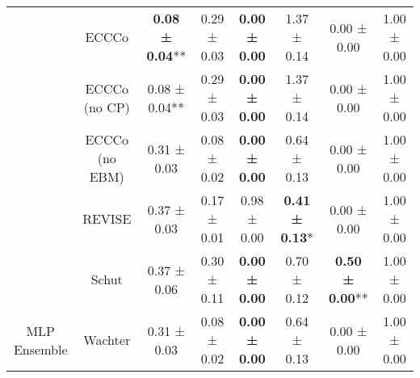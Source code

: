 \begin{table}
{\begin{tabular}[t]{cccccccc}
 & ECCCo & \textbf{0.08 ± 0.04}** & 0.29 ± 0.03\hphantom{*}\hphantom{*} & \textbf{0.00 ± 0.00}\hphantom{*}\hphantom{*} & 1.37 ± 0.14\hphantom{*}\hphantom{*} & 0.00 ± 0.00\hphantom{*}\hphantom{*} & 1.00 ± 0.00\hphantom{*}\hphantom{*}\\

 & ECCCo (no CP) & 0.08 ± 0.04** & 0.29 ± 0.03\hphantom{*}\hphantom{*} & \textbf{0.00 ± 0.00}\hphantom{*}\hphantom{*} & 1.37 ± 0.14\hphantom{*}\hphantom{*} & 0.00 ± 0.00\hphantom{*}\hphantom{*} & 1.00 ± 0.00\hphantom{*}\hphantom{*}\\

 & ECCCo (no EBM) & 0.31 ± 0.03\hphantom{*}\hphantom{*} & 0.08 ± 0.02\hphantom{*}\hphantom{*} & \textbf{0.00 ± 0.00}\hphantom{*}\hphantom{*} & 0.64 ± 0.13\hphantom{*}\hphantom{*} & 0.00 ± 0.00\hphantom{*}\hphantom{*} & 1.00 ± 0.00\hphantom{*}\hphantom{*}\\

 & REVISE & 0.37 ± 0.03\hphantom{*}\hphantom{*} & 0.17 ± 0.01\hphantom{*}\hphantom{*} & 0.98 ± 0.00\hphantom{*}\hphantom{*} & \textbf{0.41 ± 0.13}*\hphantom{*} & 0.00 ± 0.00\hphantom{*}\hphantom{*} & 1.00 ± 0.00\hphantom{*}\hphantom{*}\\

 & Schut & 0.37 ± 0.06\hphantom{*}\hphantom{*} & 0.30 ± 0.11\hphantom{*}\hphantom{*} & \textbf{0.00 ± 0.00}\hphantom{*}\hphantom{*} & 0.70 ± 0.12\hphantom{*}\hphantom{*} & \textbf{0.50 ± 0.00}** & 1.00 ± 0.00\hphantom{*}\hphantom{*}\\

\multirow[t]{-9}{*}{\centering\arraybackslash MLP Ensemble} & Wachter & 0.31 ± 0.03\hphantom{*}\hphantom{*} & 0.08 ± 0.02\hphantom{*}\hphantom{*} & \textbf{0.00 ± 0.00}\hphantom{*}\hphantom{*} & 0.64 ± 0.13\hphantom{*}\hphantom{*} & 0.00 ± 0.00\hphantom{*}\hphantom{*} & 1.00 ± 0.00\hphantom{*}\hphantom{*}\\
\bottomrule
\end{tabular}}
\end{table}
